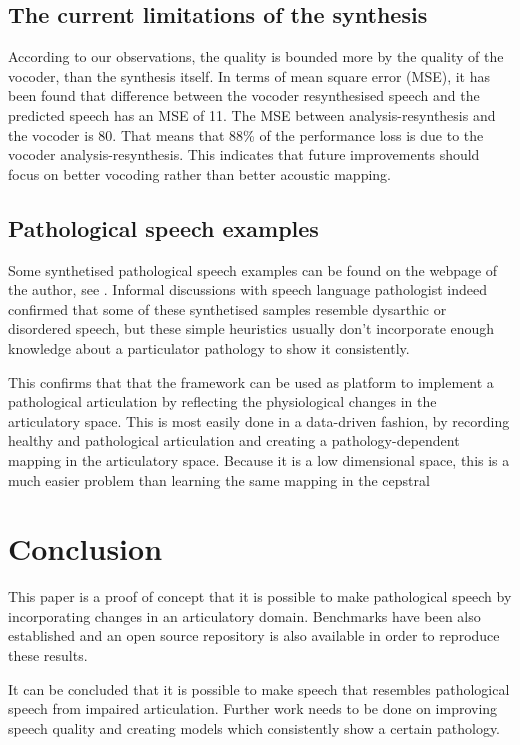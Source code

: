 \documentclass[a4paper]{article}
\begin{document}
\subsection{The current limitations of the synthesis} \label{section:limitations}
According to our observations, the quality is bounded more by the
quality of the vocoder, than the synthesis itself. In terms of mean square
error (MSE), it has been found that difference between the vocoder resynthesised speech
and the predicted speech has an MSE of 11. The MSE
between analysis-resynthesis and the vocoder is 80. That means that 88\% of the performance loss
is due to the vocoder analysis-resynthesis. This indicates that
future improvements should focus on better vocoding rather than better
acoustic mapping.


\subsection{Pathological speech examples}

Some synthetised pathological speech examples can be found on the webpage of the
author, see \cite{Speech2019}.
Informal discussions with speech language pathologist indeed confirmed
that some of these synthetised samples resemble dysarthic or disordered speech,
but these simple heuristics usually don't incorporate enough knowledge
about a particulator pathology to show it consistently.

This confirms that that the framework can be used as platform to implement a
pathological articulation by reflecting the physiological changes in the articulatory
space. This is most easily done in a data-driven fashion, by recording healthy
and pathological articulation and creating a pathology-dependent mapping
in the articulatory space. Because it is a low dimensional space, this
is a much easier problem than learning the same mapping in the cepstral

\section{Conclusion}

This paper is a proof of concept that it is possible to make pathological
speech by incorporating changes in an articulatory domain. Benchmarks
have been also established and an open source repository is also available
in order to reproduce these results. 

It can be concluded that it is possible to make speech that resembles
pathological speech from impaired articulation. Further work needs to be done on improving
speech quality and creating models which consistently show a certain
pathology.
\end{document}
